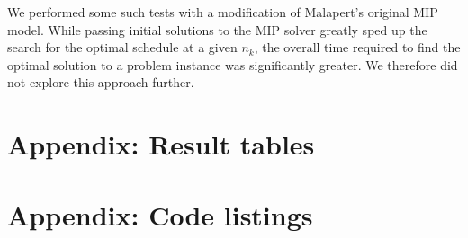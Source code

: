 \documentclass[13pt, letterpaper, oneside]{book}
\begin{document}
We performed some such tests with a modification of Malapert's original MIP
model. While passing initial solutions to the MIP solver greatly sped up the
search for the optimal schedule at a given $n_k$, the overall time required to
find the optimal solution to a problem instance was significantly greater. We
therefore did not explore this approach further.

\chapter{Appendix: Result tables}
\begin{longtable}

\end{longtable}

\chapter{Appendix: Code listings}
\backmatter
\end{document}
